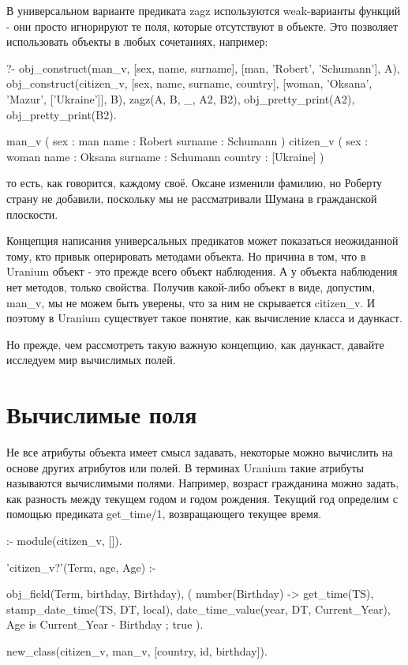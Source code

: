 \documentclass[a4paper]{book}
\def\ur{Uranium}
\begin{document}
В универсальном варианте предиката zagz используются
weak-варианты функций - они просто игнорируют те поля, которые
отсутствуют в объекте. Это позволяет использовать объекты в любых
сочетаниях, например:

\begin{example}{}{}
?- obj_construct(man_v, [sex, name, surname], 
      [man, 'Robert', 'Schumann'], A), 
   obj_construct(citizen_v, [sex, name, surname, country], 
      [woman, 'Oksana', 'Mazur', ['Ukraine']], B), 
   zagz(A, B, _, A2, B2), 
   obj_pretty_print(A2), 
   obj_pretty_print(B2).

man_v ( 
  sex : man 
  name : Robert 
  surname : Schumann 
) 
citizen_v ( 
  sex : woman 
  name : Oksana 
  surname : Schumann 
  country : [Ukraine] 
) 
\end{example}

то есть, как говорится, каждому своё. Оксане изменили фамилию, но
Роберту страну не добавили, поскольку мы не рассматривали Шумана
в гражданской плоскости.

Концепция написания универсальных предикатов может показаться
неожиданной тому, кто привык оперировать методами объекта. Но
причина в том, что в \ur{} объект - это прежде всего объект
наблюдения. А у объекта наблюдения нет методов, только
свойства. Получив какой-либо объект в виде, допустим, man\_v, мы
не можем быть уверены, что за ним не скрывается citizen\_v. И
поэтому в \ur{} существует такое понятие, как вычисление
класса и даункаст.

Но прежде, чем рассмотреть такую важную концепцию, как даункаст,
давайте исследуем мир вычислимых полей.

\section{Вычислимые поля}

Не все атрибуты объекта имеет смысл задавать, некоторые можно
вычислить на основе других атрибутов или полей. В терминах
\ur{} такие атрибуты называются вычислимыми полями. Например,
возраст гражданина можно задать, как разность между текущем годом
и годом рождения. Текущий год определим с помощью предиката
get\_time/1, возвращающего текущее время. 

\begin{example}{}{}
:- module(citizen_v, []).

'citizen_v?'(Term, age, Age) :-

        obj_field(Term, birthday, Birthday),
        (  number(Birthday)
        -> get_time(TS),
           stamp_date_time(TS, DT, local),
           date_time_value(year, DT, Current_Year),
           Age is Current_Year - Birthday
        ;
           true
        ).
        
new_class(citizen_v, man_v, [country, id, birthday]).
\end{example}
\end{document}
